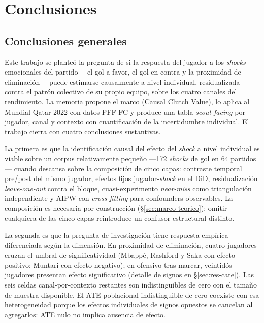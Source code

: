 \chapter{Conclusiones}
\label{ch:conclusiones}

\section{Conclusiones generales}
\label{sec:conclusiones-generales}

Este trabajo se planteó la pregunta de si la respuesta del jugador a
los \textit{shocks} emocionales del partido ---el gol a favor, el
gol en contra y la proximidad de eliminación--- puede estimarse
causalmente a nivel individual, residualizada contra el patrón
colectivo de su propio equipo, sobre los cuatro canales del
rendimiento. La memoria propone el marco \CCV{} (Causal Clutch Value),
lo aplica al Mundial Qatar 2022 con datos PFF FC y produce una
tabla \textit{scout-facing} por jugador, canal y contexto con
cuantificación de la incertidumbre individual. El trabajo cierra con
cuatro conclusiones sustantivas.

La primera es que la identificación causal del efecto del
\textit{shock} a nivel individual es viable sobre un corpus
relativamente pequeño ---172 \textit{shocks} de gol en 64 partidos---
cuando descansa sobre la composición de cinco capas: contraste
temporal pre/post del mismo jugador, efectos fijos jugador-\textit{shock}
en el DiD, residualización \textit{leave-one-out} contra el bloque,
cuasi-experimento \textit{near-miss} como triangulación independiente
y AIPW con \textit{cross-fitting} para confounders observables.
La composición es necesaria por construcción
(§\ref{sec:marco-teorico}): omitir cualquiera de las cinco capas
reintroduce un confusor estructural distinto.

La segunda es que la pregunta de investigación tiene respuesta
empírica diferenciada según la dimensión. En proximidad de
eliminación, cuatro jugadores cruzan el umbral de significatividad
(Mbappé, Rashford y Saka con efecto positivo; Muntari con efecto
negativo); en ofensivo-tras-marcar, veintidós jugadores presentan
efecto significativo (detalle de signos en §\ref{sec:res-cate}).
Las seis celdas canal-por-contexto restantes son indistinguibles de
cero con el tamaño de muestra disponible. El
ATE poblacional indistinguible de cero coexiste con esa
heterogeneidad porque los efectos individuales de signos opuestos se
cancelan al agregarlos: ATE nulo no implica ausencia de efecto.

